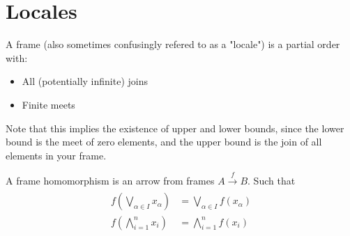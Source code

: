 \chapter{Locales}

\begin{definition}[Frame]
    A frame (also sometimes confusingly refered to as a "locale") is a partial order with:
    \begin{itemize}
        \item All (potentially infinite) joins
        \item Finite meets
    \end{itemize}
    Note that this implies the existence of upper and lower bounds, since the lower bound is the meet of zero elements, and the upper bound is the join of all elements in your frame.
\end{definition}
\begin{definition}
    A frame homomorphism is an arrow from frames $A \xrightarrow[]{f} B$. Such that
    \begin{align*}
        f\left(\bigvee_{\alpha \in I} x_\alpha \right) &= \bigvee_{\alpha \in I} f(x_\alpha) \\
        f\left(\bigwedge_{i=1}^n x_i \right) &= \bigwedge_{i=1}^n f(x_i) \\
    \end{align*}
\end{definition}

